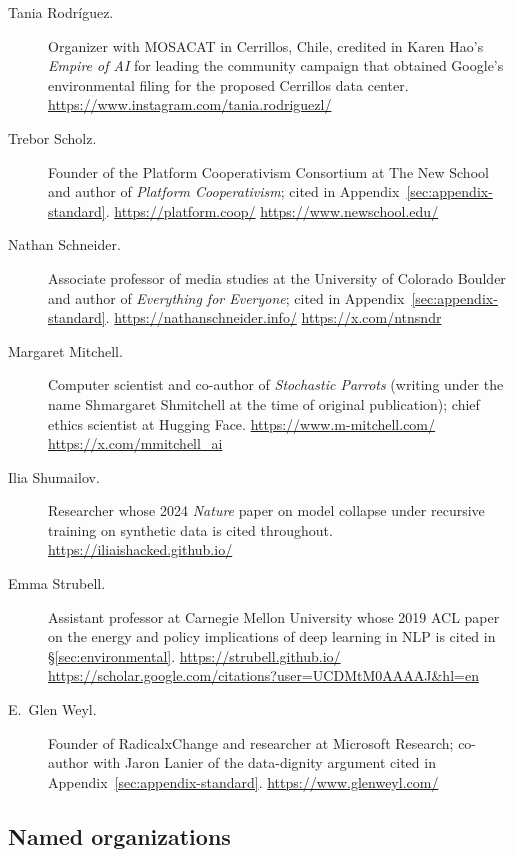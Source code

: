 \documentclass[10pt,a4paper,twocolumn]{article}
\begin{document}
\begin{description}
\item[Tania Rodr\'iguez.] Organizer with MOSACAT in Cerrillos, Chile, credited in Karen Hao's \emph{Empire of AI} for leading the community campaign that obtained Google's environmental filing for the proposed Cerrillos data center. \url{https://www.instagram.com/tania.rodriguezl/}

\item[Trebor Scholz.] Founder of the Platform Cooperativism Consortium at The New School and author of \emph{Platform Cooperativism}; cited in Appendix~\ref{sec:appendix-standard}. \url{https://platform.coop/} \quad \url{https://www.newschool.edu/}

\item[Nathan Schneider.] Associate professor of media studies at the University of Colorado Boulder and author of \emph{Everything for Everyone}; cited in Appendix~\ref{sec:appendix-standard}. \url{https://nathanschneider.info/} \quad \url{https://x.com/ntnsndr}

\item[Margaret Mitchell.] Computer scientist and co-author of \emph{Stochastic Parrots} (writing under the name Shmargaret Shmitchell at the time of original publication); chief ethics scientist at Hugging Face. \url{https://www.m-mitchell.com/} \quad \url{https://x.com/mmitchell_ai}

\item[Ilia Shumailov.] Researcher whose 2024 \emph{Nature} paper on model collapse under recursive training on synthetic data is cited throughout. \url{https://iliaishacked.github.io/}

\item[Emma Strubell.] Assistant professor at Carnegie Mellon University whose 2019 ACL paper on the energy and policy implications of deep learning in NLP is cited in \S\ref{sec:environmental}. \url{https://strubell.github.io/} \quad \url{https://scholar.google.com/citations?user=UCDMtM0AAAAJ&hl=en}

\item[E.~Glen Weyl.] Founder of RadicalxChange and researcher at Microsoft Research; co-author with Jaron Lanier of the data-dignity argument cited in Appendix~\ref{sec:appendix-standard}. \url{https://www.glenweyl.com/}

\end{description}

\subsection*{Named organizations}
\end{document}
